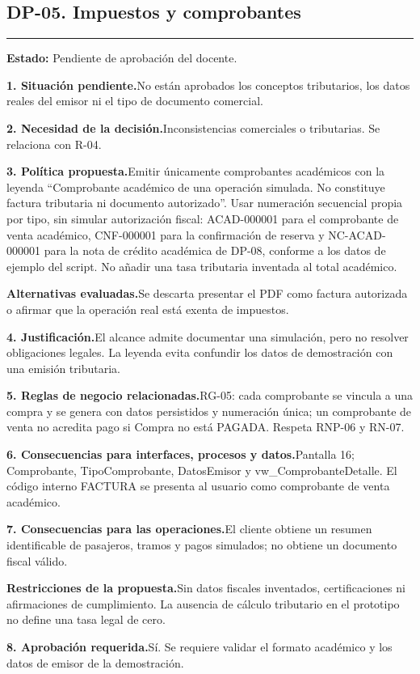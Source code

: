\documentclass[11pt,a4paper]{article}
\newcommand{\fichacampo}[2]{\noindent\textbf{\color{azulvip}#1}\enspace #2\par\vspace{3pt}}
\begin{document}
\subsection{DP-05. Impuestos y comprobantes}
{\color{doradovip}\rule{\textwidth}{.5pt}}
\textbf{Estado:} Pendiente de aprobación del docente.\par\vspace{4pt}
{\normalsize
\fichacampo{1. Situación pendiente.}{No están aprobados los conceptos tributarios, los datos reales del emisor ni el tipo de documento comercial.}
\fichacampo{2. Necesidad de la decisión.}{Inconsistencias comerciales o tributarias. Se relaciona con R-04.}
\fichacampo{3. Política propuesta.}{Emitir únicamente comprobantes académicos con la leyenda “Comprobante académico de una operación simulada. No constituye factura tributaria ni documento autorizado”. Usar numeración secuencial propia por tipo, sin simular autorización fiscal: ACAD-000001 para el comprobante de venta académico, CNF-000001 para la confirmación de reserva y NC-ACAD-000001 para la nota de crédito académica de DP-08, conforme a los datos de ejemplo del script. No añadir una tasa tributaria inventada al total académico.}
\fichacampo{Alternativas evaluadas.}{Se descarta presentar el PDF como factura autorizada o afirmar que la operación real está exenta de impuestos.}
\fichacampo{4. Justificación.}{El alcance admite documentar una simulación, pero no resolver obligaciones legales. La leyenda evita confundir los datos de demostración con una emisión tributaria.}
\fichacampo{5. Reglas de negocio relacionadas.}{RG-05: cada comprobante se vincula a una compra y se genera con datos persistidos y numeración única; un comprobante de venta no acredita pago si Compra no está PAGADA. Respeta RNP-06 y RN-07.}
\fichacampo{6. Consecuencias para interfaces, procesos y datos.}{Pantalla 16; Comprobante, TipoComprobante, DatosEmisor y vw\_ComprobanteDetalle. El código interno FACTURA se presenta al usuario como comprobante de venta académico.}
\fichacampo{7. Consecuencias para las operaciones.}{El cliente obtiene un resumen identificable de pasajeros, tramos y pagos simulados; no obtiene un documento fiscal válido.}
\fichacampo{Restricciones de la propuesta.}{Sin datos fiscales inventados, certificaciones ni afirmaciones de cumplimiento. La ausencia de cálculo tributario en el prototipo no define una tasa legal de cero.}
\fichacampo{8. Aprobación requerida.}{Sí. Se requiere validar el formato académico y los datos de emisor de la demostración.}
}
\clearpage
\end{document}

